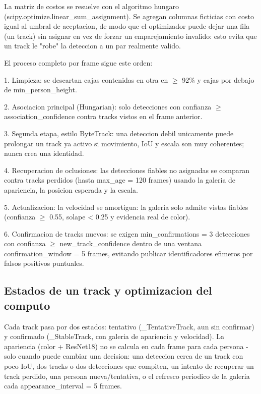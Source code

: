 \documentclass[12pt,letterpaper]{article}
\begin{document}
La matriz de costos se resuelve con el algoritmo hungaro (scipy.optimize.linear\_\allowbreak sum\_\allowbreak assignment). Se agregan columnas ficticias con costo igual al umbral de aceptacion, de modo que el optimizador puede dejar una fila (un track) sin asignar en vez de forzar un emparejamiento invalido: esto evita que un track le "robe" la deteccion a un par realmente valido.


El proceso completo por frame sigue este orden:


1. Limpieza: se descartan cajas contenidas en otra en $\geq$ 92\% y cajas por debajo de min\_\allowbreak person\_\allowbreak height.


2. Asociacion principal (Hungarian): solo detecciones con confianza $\geq$ association\_\allowbreak confidence contra tracks vistos en el frame anterior.


3. Segunda etapa, estilo ByteTrack: una deteccion debil unicamente puede prolongar un track ya activo si movimiento, IoU y escala son muy coherentes; nunca crea una identidad.


4. Recuperacion de oclusiones: las detecciones fiables no asignadas se comparan contra tracks perdidos (hasta max\_\allowbreak age = 120 frames) usando la galeria de apariencia, la posicion esperada y la escala.


5. Actualizacion: la velocidad se amortigua: la galeria solo admite vistas fiables (confianza $\geq$ 0.55, solape < 0.25 y evidencia real de color).


6. Confirmacion de tracks nuevos: se exigen min\_\allowbreak confirmations = 3 detecciones con confianza $\geq$ new\_\allowbreak track\_\allowbreak confidence dentro de una ventana confirmation\_\allowbreak window = 5 frames, evitando publicar identificadores efimeros por falsos positivos puntuales.


\subsection{Estados de un track y optimizacion del computo}

Cada track pasa por dos estados: tentativo (\_\allowbreak TentativeTrack, aun sin confirmar) y confirmado (\_\allowbreak StableTrack, con galeria de apariencia y velocidad). La apariencia (color + ResNet18) no se calcula en cada frame para cada persona -solo cuando puede cambiar una decision: una deteccion cerca de un track con poco IoU, dos tracks o dos detecciones que compiten, un intento de recuperar un track perdido, una persona nueva/tentativa, o el refresco periodico de la galeria cada appearance\_\allowbreak interval = 5 frames.
\end{document}
